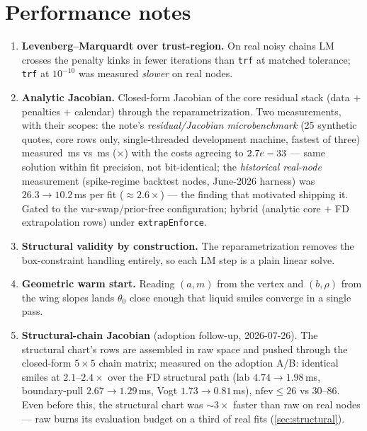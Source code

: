 \documentclass[11pt]{article}
\begin{document}
\section{Performance notes}
\label{app:perf}

\begin{enumerate}[leftmargin=1.6em]
\item \textbf{Levenberg--Marquardt over trust-region.} On real noisy chains LM
crosses the penalty kinks in fewer iterations than \texttt{trf} at matched
tolerance; \texttt{trf} at $10^{-10}$ was measured \emph{slower} on real nodes.
\item \textbf{Analytic Jacobian.} Closed-form Jacobian of the core residual
stack (data $+$ penalties $+$ calendar) through the reparametrization. Two
measurements, with their scopes: the note's \emph{residual/Jacobian
microbenchmark} (25 synthetic quotes, core rows only, single-threaded
development machine, fastest of three) measured \svianalyticms\,ms vs
\svifdms\,ms (\svispeedup$\times$) with the costs agreeing to $2.7e-33$
--- same solution within fit precision, not bit-identical; the
\emph{historical real-node} measurement (spike-regime backtest nodes,
June-2026 harness) was $26.3\to10.2$\,ms per fit ($\approx2.6\times$) --- the
finding that motivated shipping it. Gated to the var-swap/prior-free
configuration; hybrid (analytic core $+$ FD extrapolation rows) under
\texttt{extrapEnforce}.
\item \textbf{Structural validity by construction.} The reparametrization
removes the box-constraint handling entirely, so each LM step is a plain
linear solve.
\item \textbf{Geometric warm start.} Reading $(a,m)$ from the vertex and
$(b,\rho)$ from the wing slopes lands $\theta_0$ close enough that liquid smiles
converge in a single pass.
\item \textbf{Structural-chain Jacobian} (adoption follow-up, 2026-07-26).
The structural chart's rows are assembled in raw space and pushed through the
closed-form $5\times5$ chain matrix; measured on the adoption A/B: identical
smiles at $2.1$--$2.4\times$ over the FD structural path (lab
$4.74\to1.98$\,ms, boundary-pull $2.67\to1.29$\,ms, Vogt $1.73\to0.81$\,ms),
$\text{nfev}\le26$ vs $30$--$86$. Even before this, the structural chart was
$\sim3\times$ faster than raw on real nodes --- raw burns its evaluation
budget on a third of real fits (\cref{sec:structural}).
\end{enumerate}
\end{document}
